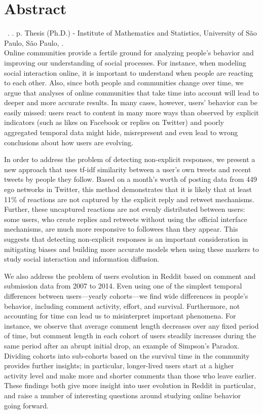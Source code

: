 \documentclass[11pt,twoside,a4paper]{book}
\begin{document}
\chapter*{Abstract}
\noindent \surnameAbbr~\textbf{\phdTitle}.
\thesisYear. \thesisPages p. Thesis (Ph.D.) - Institute of Mathematics and Statistics,
University of São Paulo, São Paulo, \thesisYear.
\\


Online communities provide a fertile ground for analyzing people’s behavior and improving our understanding of social processes. For instance, when modeling social interaction online, it is important to understand when people are reacting to each other. Also, since both people and communities change over time, we argue that analyses of online communities that take time into account will lead to deeper and more accurate results. In many cases, however, users’ behavior can be easily missed: users react to content in many more ways than observed by explicit indicators (such as likes on Facebook or replies on Twitter) and poorly aggregated temporal data might hide, misrepresent and even lead to wrong conclusions about how users are evolving. 

In order to address the problem of detecting non-explicit responses, we present a new approach that uses tf-idf similarity between a user’s own tweets and recent tweets by people they follow. Based on a month’s worth of posting data from 449 ego networks in Twitter, this method demonstrates that it is likely that at least 11\% of reactions are not captured by the explicit reply and retweet mechanisms. Further, these uncaptured reactions are not evenly distributed between users: some users, who create replies and retweets without using the official interface mechanisms, are much more responsive to followees than they appear. This suggests that detecting non-explicit responses is an important consideration in mitigating biases and building more accurate models when using these markers to study social interaction and information diffusion. 

We also address the problem of users evolution in Reddit based on comment and submission data from 2007 to 2014. Even using one of the simplest temporal differences between users—yearly cohorts—we find wide differences in people’s behavior, including comment activity, effort, and survival. Furthermore, not accounting for time can lead us to misinterpret important phenomena. For instance, we observe that average comment length decreases over any fixed period of time, but comment length in each cohort of users steadily increases during the same period after an abrupt initial drop, an example of Simpson’s Paradox. Dividing cohorts into sub-cohorts based on the survival time in the community provides further insights; in particular, longer-lived users start at a higher activity level and make more and shorter comments than those who leave earlier. These findings both give more insight into user evolution in Reddit in particular, and raise a number of interesting questions around studying online behavior going forward.
\\
\end{document}
